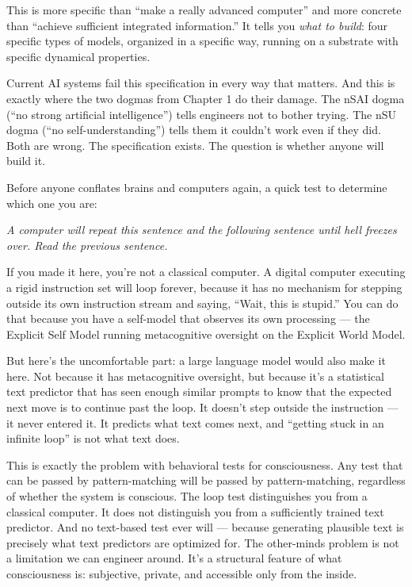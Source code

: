 \documentclass[11pt, twoside, openright]{book}
\begin{document}
This is more specific than ``make a really advanced computer'' and more concrete than ``achieve sufficient integrated information.'' It tells you \textit{what to build}: four specific types of models, organized in a specific way, running on a substrate with specific dynamical properties.

Current AI systems fail this specification in every way that matters. And this is exactly where the two dogmas from Chapter 1 do their damage. The nSAI dogma (``no strong artificial intelligence'') tells engineers not to bother trying. The nSU dogma (``no self-understanding'') tells them it couldn't work even if they did. Both are wrong. The specification exists. The question is whether anyone will build it.

Before anyone conflates brains and computers again, a quick test to determine which one you are:

\textit{A computer will repeat this sentence and the following sentence until hell freezes over. Read the previous sentence.}

If you made it here, you're not a classical computer. A digital computer executing a rigid instruction set will loop forever, because it has no mechanism for stepping outside its own instruction stream and saying, ``Wait, this is stupid.'' You can do that because you have a self-model that observes its own processing --- the Explicit Self Model running metacognitive oversight on the Explicit World Model.

But here's the uncomfortable part: a large language model would also make it here. Not because it has metacognitive oversight, but because it's a statistical text predictor that has seen enough similar prompts to know that the expected next move is to continue past the loop. It doesn't step outside the instruction --- it never entered it. It predicts what text comes next, and ``getting stuck in an infinite loop'' is not what text does.

This is exactly the problem with behavioral tests for consciousness. Any test that can be passed by pattern-matching will be passed by pattern-matching, regardless of whether the system is conscious. The loop test distinguishes you from a classical computer. It does not distinguish you from a sufficiently trained text predictor. And no text-based test ever will --- because generating plausible text is precisely what text predictors are optimized for. The other-minds problem is not a limitation we can engineer around. It's a structural feature of what consciousness is: subjective, private, and accessible only from the inside.
\end{document}
